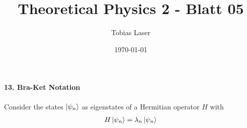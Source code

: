 \documentclass[11pt,a4paper]{scrartcl}
\begin{document}
    \title{Theoretical Physics 2 - Blatt 05}
    \author{Tobias Laser}
    \date{\today}
    \maketitle
    \vfill
    \thispagestyle{empty}


    \paragraph{13. Bra-Ket Notation} 

    Consider the states $\ket{\psi_n}$ as eigenstates of a Hermitian operator $H$ with 
    \begin{align*}
        H \ket{\psi_n} = \lambda_n \ket{\psi_n}
    \end{align*}
\end{document}
